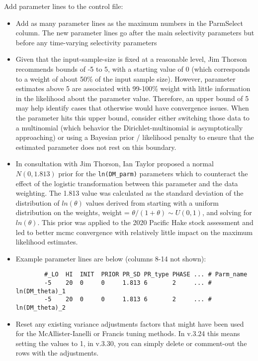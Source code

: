 Add parameter lines to the control file:
\begin{itemize}
	\item Add as many parameter lines as the maximum numbers in the ParmSelect column. The new parameter lines go after the main selectivity parameters but before any time-varying selectivity parameters
	\item Given that the input-sample-size is fixed at a reasonable level,
	Jim Thorson recommends bounds of -5 to 5, with a starting value of 0
	(which corresponds to a weight of about 50\% of the input sample size).
	However, parameter estimates above 5 are associated with 99-100\% weight
	with little information in the likelihood about the parameter value.
	Therefore, an upper bound of 5 may help identify cases that otherwise
	would have convergence issues.  When the parameter hits this upper
	bound, consider either switching those data to a multinomial (which
	behavior the Dirichlet-multinomial is asymptotically approaching) or using a Bayesian prior
	/ likelihood penalty to ensure that the estimated parameter does not
	rest on this boundary.  	
	\item In consultation with Jim Thorson, Ian Taylor proposed a normal
	$N(0, 1.813)$ prior for the \texttt{ln(DM\_parm)} parameters which to
	counteract the effect of the logistic transformation between this
	parameter and the data weighting. The 1.813 value was calculated as the
	standard deviation of the distribution of $ln(\theta)$ values derived
	from starting with a uniform distribution on the weights, weight =
	$\theta/(1+\theta) \sim U(0,1)$, and solving for $ln(\theta)$. This
	prior was applied to the 2020 Pacific Hake stock assessment
	\citep{grandin-status-2020} and led to better \gls{mcmc} convergence with
	relatively little impact on the maximum likelihood estimates. 
	\item Example parameter lines are below (columns 8-14 not shown): 
    \begin{small}
      \begin{minipage}{\linewidth} 
		\begin{verbatim}
		#_LO  HI  INIT  PRIOR PR_SD PR_type PHASE ... # Parm_name
		-5    20  0     0     1.813 6       2     ... # ln(DM_theta)_1
		-5    20  0     0     1.813 6       2     ... # ln(DM_theta)_2
		\end{verbatim}
      \end{minipage}
    \end{small}
	\item Reset any existing variance adjustments factors that might have been used for the McAllister-Ianelli or Francis tuning methods. In v.3.24 this means setting the values to 1, in v.3.30, you can simply delete or comment-out the rows with the adjustments.
\end{itemize}

